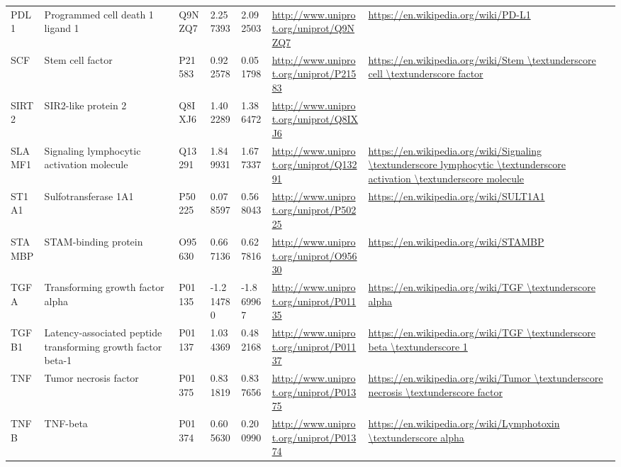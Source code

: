 \begin{table}[H]
\begin{tabular}{ lllllll }
        \multicolumn{1}{l|}{ PDL1 } &  Programmed cell death 1 ligand 1   & Q9NZQ7   & 2.257393   & 2.092503   & \url{http://www.uniprot.org/uniprot/Q9NZQ7}   & \url{https://en.wikipedia.org/wiki/PD-L1}          \\ 
        \multicolumn{1}{l|}{ SCF } &  Stem cell factor   & P21583   & 0.922578   & 0.051798   & \url{http://www.uniprot.org/uniprot/P21583}   & \url{https://en.wikipedia.org/wiki/Stem \textunderscore cell \textunderscore factor}          \\ 
        \multicolumn{1}{l|}{ SIRT2 } &  SIR2-like protein 2   & Q8IXJ6   & 1.402289   & 1.386472   & \url{http://www.uniprot.org/uniprot/Q8IXJ6}   &           \\ 
        \multicolumn{1}{l|}{ SLAMF1 } &  Signaling lymphocytic activation molecule   & Q13291   & 1.849931   & 1.677337   & \url{http://www.uniprot.org/uniprot/Q13291}   & \url{https://en.wikipedia.org/wiki/Signaling \textunderscore lymphocytic \textunderscore activation \textunderscore molecule}          \\ 
        \multicolumn{1}{l|}{ ST1A1 } &  Sulfotransferase 1A1   & P50225   & 0.078597   & 0.568043   & \url{http://www.uniprot.org/uniprot/P50225}   & \url{https://en.wikipedia.org/wiki/SULT1A1}          \\ 
        \multicolumn{1}{l|}{ STAMBP } &  STAM-binding protein   & O95630   & 0.667136   & 0.627816   & \url{http://www.uniprot.org/uniprot/O95630}   & \url{https://en.wikipedia.org/wiki/STAMBP}          \\ 
        \multicolumn{1}{l|}{ TGFA } &  Transforming growth factor alpha   & P01135   & -1.214780   & -1.869967   & \url{http://www.uniprot.org/uniprot/P01135}   & \url{https://en.wikipedia.org/wiki/TGF \textunderscore alpha}          \\ 
        \multicolumn{1}{l|}{ TGFB1 } &  Latency-associated peptide transforming growth factor beta-1   & P01137   & 1.034369   & 0.482168   & \url{http://www.uniprot.org/uniprot/P01137}   & \url{https://en.wikipedia.org/wiki/TGF \textunderscore beta \textunderscore 1}          \\ 
        \multicolumn{1}{l|}{ TNF } &  Tumor necrosis factor   & P01375   & 0.831819   & 0.837656   & \url{http://www.uniprot.org/uniprot/P01375}   & \url{https://en.wikipedia.org/wiki/Tumor \textunderscore necrosis \textunderscore factor}          \\ 
        \multicolumn{1}{l|}{ TNFB } &  TNF-beta   & P01374   & 0.605630   & 0.200990   & \url{http://www.uniprot.org/uniprot/P01374}   & \url{https://en.wikipedia.org/wiki/Lymphotoxin \textunderscore alpha}          \\ 

\end{tabular}
\end{table}
